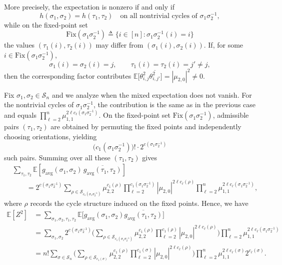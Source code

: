 \documentclass[conference]{IEEEtran}
\theoremstyle{plain}
\theoremstyle{definition}
\newcommand{\E}{\mathbb {E}}
\newcommand{\defeq}{\triangleq}
\begin{document}
 More precisely, the expectation is nonzero if and only if
 \[
  h(\sigma_1,\sigma_2)=h(\tau_1,\tau_2)
  \quad\text{on all nontrivial cycles of }\sigma_1\sigma_2^{-1},
 \]
 while on the fixed-point set
 \[
  \mathrm{Fix}(\sigma_1\sigma_2^{-1})\defeq\{i\in[n]:\sigma_1\sigma_2^{-1}(i)=i\}
 \]
 the values $(\tau_1(i),\tau_2(i))$ may differ from
 $(\sigma_1(i),\sigma_2(i))$. If, for some
 $i\in\mathrm{Fix}(\sigma_1\sigma_2^{-1})$,
 \[
  \sigma_1(i)=\sigma_2(i)=j,
  \qquad
  \tau_1(i)=\tau_2(i)=j'\neq j,
 \]
 then the corresponding factor contributes \(
 \E\Big[\theta_{i,j}^2\overline{\theta_{i,j'}^2}\Big] =|\mu_{2,0}|^2\neq 0. \)

 Fix $\sigma_1,\sigma_2\in \mathcal{S}_n$ and we analyze when the mixed
 expectation does not vanish. For the nontrivial cycles of
 $\sigma_1\sigma_2^{-1}$, the contribution is the same as in the previous case
 and equals \( \prod_{\ell=2}^n \mu_{1,1}^{2\ell
 c_\ell(\sigma_1\sigma_2^{-1})}. \) On the fixed-point set
 $\mathrm{Fix}(\sigma_1\sigma_2^{-1})$, admissible pairs $(\tau_1,\tau_2)$ are
 obtained by permuting the fixed points and independently choosing
 orientations, yielding
 \[
  \big(c_1(\sigma_1\sigma_2^{-1})\big)!\cdot 2^{c(\sigma_1\sigma_2^{-1})}
 \]
 such pairs. Summing over all these $(\tau_1,\tau_2)$ gives
 \begin{align*}
   & \sum_{\tau_1,\tau_2}
  \E\left[
   g_{\mathrm{avg}}(\sigma_1,\sigma_2)\,
   \overline{g_{\mathrm{avg}}(\tau_1,\tau_2)}
  \right]                 \\
   & \qquad =
  2^{c(\sigma_1\sigma_2^{-1})}
  \sum_{\rho\in \mathcal{S}_{c_1(\sigma_1\sigma_2^{-1})}}
  \mu_{2,2}^{c_1(\rho)}
  \prod_{\ell=2}^{c_1(\sigma_1\sigma_2^{-1})} |\mu_{2,0}|^{2\ell c_\ell(\rho)}
  \prod_{\ell=2}^n \mu_{1,1}^{2\ell c_\ell(\sigma_1\sigma_2^{-1})},
 \end{align*}
 where $\rho$ records the cycle structure induced on the fixed points.
 Hence, we have
 \begin{align*}
  \E[Z^2] & =\sum_{\sigma_1,\sigma_2,\tau_1,\tau_2}
  \E\Big[g_\mathrm{avg}(\sigma_1,\sigma_2)\overline{ g_\mathrm{avg}(\tau_1,\tau_2)}\Big] \\
          & =\sum_{\sigma_1,\sigma_2} 2^{c(\sigma_1\sigma_2^{-1})}
  \Big(\sum_{\rho\in  \mathcal{S}_{c_{1}(\sigma_1\sigma_2^{-1})}}\mu_{2,2}^{c_1(\rho)}
  \prod_{\ell=2}^{c_1(\rho)}|\mu_{2,0}|^{2\ell c_\ell(\rho)}\Big)
  \prod_{\ell=2}^{n}\mu_{1,1}^{2\ell c_\ell(\sigma_1\sigma_2^{-1})}                      \\
          & =n!\sum_{\sigma\in \mathcal{S}_n}
  \Big(\sum_{\rho\in  \mathcal{S}_{c_{1}(\sigma)}}\mu_{2,2}^{c_1(\rho)}\prod_{\ell=2}^{c_1(\sigma)}|\mu_{2,0}|^{2\ell c_\ell(\rho)}\Big)
  \prod_{\ell=2}^{n}\mu_{1,1}^{2\ell c_\ell(\sigma)}2^{c_\ell(\sigma)}.
 \end{align*}
\end{document}
